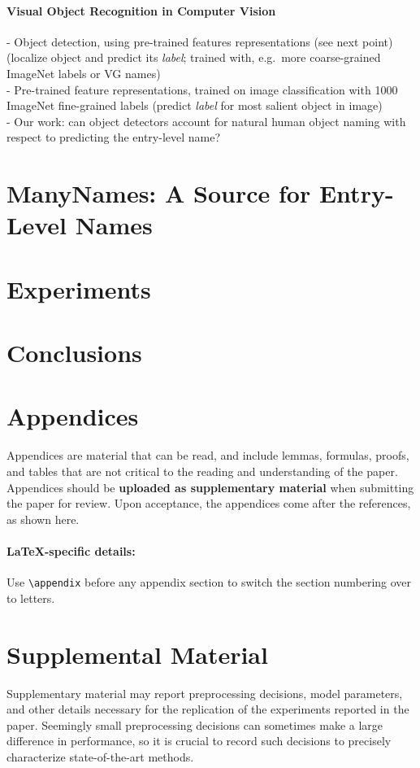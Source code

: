 \documentclass[11pt,a4paper]{article}
\begin{document}
\paragraph{Visual Object Recognition in Computer Vision}
- Object detection, using pre-trained features representations (see next point) (localize object and predict its \textit{label}; trained with, e.g.\ more coarse-grained ImageNet labels or VG names)\\
- Pre-trained feature representations, trained on image classification with 1000 ImageNet fine-grained labels (predict \textit{label} for most salient object in image)\\
- Our work: can object detectors account for natural human object naming with respect to predicting the entry-level name? 


\section{ManyNames: A Source for Entry-Level Names}
\label{sec:manynames}


\section{Experiments}
\label{sec:experiments}


\section{Conclusions}
\label{sec:conclusions}

%
%

\appendix

\section{Appendices}
\label{sec:appendix}
Appendices are material that can be read, and include lemmas, formulas, proofs, and tables that are not critical to the reading and understanding of the paper. 
Appendices should be \textbf{uploaded as supplementary material} when submitting the paper for review.
Upon acceptance, the appendices come after the references, as shown here.

\paragraph{\LaTeX-specific details:}
Use {\small\verb|\appendix|} before any appendix section to switch the section numbering over to letters.


\section{Supplemental Material}
\label{sec:supplemental}
Supplementary material may report preprocessing decisions, model parameters, and other details necessary for the replication of the experiments reported in the paper.
Seemingly small preprocessing decisions can sometimes make a large difference in performance, so it is crucial to record such decisions to precisely characterize state-of-the-art methods. 
\end{document}
